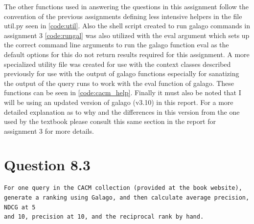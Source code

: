 \documentclass[11pt]{article}
\begin{document}
The other functions used in answering the questions in this assignment follow the convention of the previous assignments defining less intensive helpers in the file util.py seen in \autoref{code:util}.  Also the shell script created to run galago commands in assignment 3 \autoref{code:rungal} was also utilized with the eval argument which sets up the correct command line arguments to run the galago function eval as the  default options for this do not return results required for this assignment. A more specialized utility file was created for use with the context classes described previously for use with the output of galago functions especially for sanatizing the output of the query runs to work with the eval function of galago. These functions can be seen in \autoref{code:cacm_help}.  \newline \newline Finally it must also be noted that I will be using an updated version of galago (v3.10) in this report. For a more detailed explanation as to why and the differences in this version from the one used by the textbook please consult this same section in the report for assignment 3 for more details.
\newpage
\section{Question 8.3} \label{q1}
\begin{verbatim}
For one query in the CACM collection (provided at the book website), 
generate a ranking using Galago, and then calculate average precision, NDCG at 5
and 10, precision at 10, and the reciprocal rank by hand.
\end{verbatim}
\end{document}
